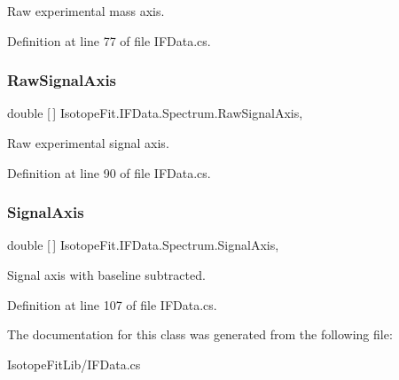 Raw experimental mass axis. 



Definition at line 77 of file I\+F\+Data.\+cs.

\mbox{\label{class_isotope_fit_1_1_i_f_data_1_1_spectrum_a948927d795db6a73eb1ddeac4f294cac}} 
\subsubsection{\texorpdfstring{Raw\+Signal\+Axis}{RawSignalAxis}}
{\footnotesize\ttfamily double \mbox{[}$\,$\mbox{]} Isotope\+Fit.\+I\+F\+Data.\+Spectrum.\+Raw\+Signal\+Axis\hspace{0.3cm}{\ttfamily [get]}, {\ttfamily [set]}}



Raw experimental signal axis. 



Definition at line 90 of file I\+F\+Data.\+cs.

\mbox{\label{class_isotope_fit_1_1_i_f_data_1_1_spectrum_a561e2e683aee78aed97a967a68b474e9}} 
\subsubsection{\texorpdfstring{Signal\+Axis}{SignalAxis}}
{\footnotesize\ttfamily double \mbox{[}$\,$\mbox{]} Isotope\+Fit.\+I\+F\+Data.\+Spectrum.\+Signal\+Axis\hspace{0.3cm}{\ttfamily [get]}, {\ttfamily [set]}}



Signal axis with baseline subtracted. 



Definition at line 107 of file I\+F\+Data.\+cs.



The documentation for this class was generated from the following file\+:\begin{DoxyCompactItemize}
\item 
Isotope\+Fit\+Lib/I\+F\+Data.\+cs\end{DoxyCompactItemize}
